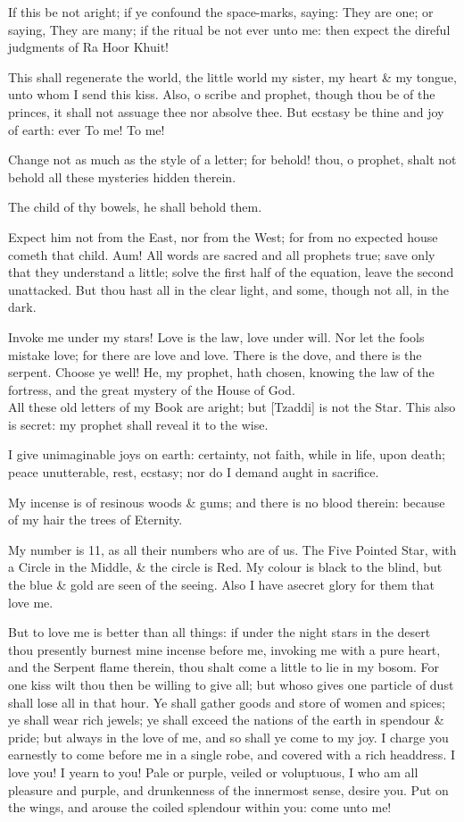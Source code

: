 If this be not aright; if ye confound the space-marks, saying: They are one; or saying, They are many; if the ritual be not ever unto me: then expect the direful judgments of Ra Hoor Khuit!

This shall regenerate the world, the little world my sister, my heart \& my tongue, unto whom I send this kiss. Also, o scribe and prophet, though thou be of the princes, it shall not assuage thee nor absolve thee. But ecstasy be thine and joy of earth: ever To me! To me!

Change not as much as the style of a letter; for behold! thou, o prophet, shalt not behold all these mysteries hidden therein.

The child of thy bowels, he shall behold them.

Expect him not from the East, nor from the West; for from no expected house cometh that child. Aum! All words are sacred and all prophets true; save only that they understand a little; solve the first half of the equation, leave the second unattacked. But thou hast all in the clear light, and some, though not all, in the dark.

Invoke me under my stars! Love is the law, love under will. Nor let the fools mistake love; for there are love and love. There is the dove, and there is the serpent. Choose ye well! He, my prophet, hath chosen, knowing the law of the fortress, and the great mystery of the House of God.
\\
All these old letters of my Book are aright; but [Tzaddi] is not the Star. This also is secret: my prophet shall reveal it to the wise.

I give unimaginable joys on earth: certainty, not faith, while in life, upon death; peace unutterable, rest, ecstasy; nor do I demand aught in sacrifice.

My incense is of resinous woods \& gums; and there is no blood therein: because of my hair the trees of Eternity.

My number is 11, as all their numbers who are of us. The Five Pointed Star, with a Circle in the Middle, \& the circle is Red. My colour is black to the blind, but the blue \& gold are seen of the seeing. Also I have asecret glory for them that love me.

But to love me is better than all things: if under the night stars in the desert thou presently burnest mine incense before me, invoking me with a pure heart, and the Serpent flame therein, thou shalt come a little to lie in my bosom. For one kiss wilt thou then be willing to give all; but whoso gives one particle of dust shall lose all in that hour. Ye shall gather goods and store of women and spices; ye shall wear rich jewels; ye shall exceed the nations of the earth in spendour \& pride; but always in the love of me, and so shall ye come to my joy. I charge you earnestly to come before me in a single robe, and covered with a rich headdress. I love you! I yearn to you! Pale or purple, veiled or voluptuous, I who am all pleasure and purple, and drunkenness of the innermost sense, desire you. Put on the wings, and arouse the coiled splendour within you: come unto me!

